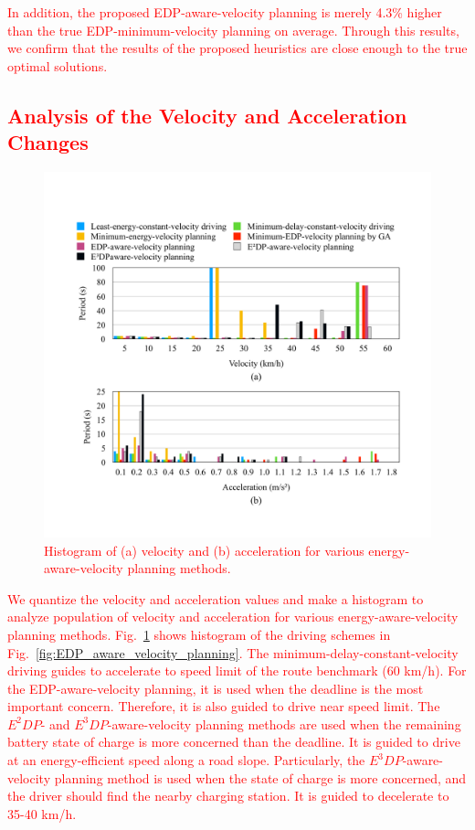\documentclass{IEEEtran}
\begin{document}
\textcolor{red}{In addition, the proposed EDP-aware-velocity planning is merely 4.3\% higher than the true EDP-minimum-velocity planning on average. Through this results, we confirm that the results of the proposed heuristics are close enough to the true optimal solutions.}


\textcolor{red}{\subsection{Analysis of the Velocity and Acceleration Changes}}


\begin{figure}	%
\centering
\includegraphics[width=\hsize]{Figures/Histogram.pdf}
\caption{\textcolor{red}{Histogram of (a) velocity and (b) acceleration for various energy-aware-velocity planning methods.}}
\label{fig:histogram}
\end{figure}


\textcolor{red}{We quantize the velocity and acceleration values and make a histogram to analyze population of velocity and acceleration for various energy-aware-velocity planning methods. Fig.~\ref{fig:histogram} shows histogram of the driving schemes in Fig.~\ref{fig:EDP_aware_velocity_planning}. The minimum-delay-constant-velocity driving guides to accelerate to speed limit of the route benchmark (60 km/h). For the EDP-aware-velocity planning, it is used when the deadline is the most important concern. Therefore, it is also guided to drive near speed limit. The $E^2DP$- and $E^3DP$-aware-velocity planning methods are used when the remaining battery state of charge is more concerned than the deadline. It is guided to drive at an energy-efficient speed along a road slope. Particularly, the $E^3DP$-aware-velocity planning method is used when the state of charge is more concerned, and the driver should find the nearby charging station. It is guided to decelerate to 35-40 km/h.}\\
\end{document}
